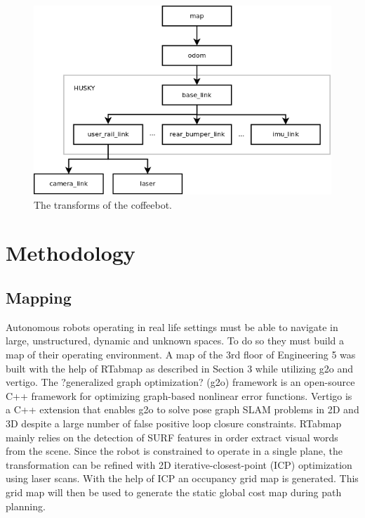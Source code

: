 \documentclass[letterpaper, 10 pt, conference]{ieeeconf}  %
\begin{document}
	\begin{figure}[!ht]
		\centering
		\includegraphics[width=1.0\columnwidth]{Figures/ROS_TF_diagram}
		\caption{The transforms of the coffeebot.}
		\label{transform_tree}
	\end{figure}

\section{Methodology}

\subsection{Mapping}

Autonomous robots operating in real life settings must be able to navigate in large, unstructured, dynamic and unknown spaces. To do so they must build a map of their operating environment. A map of the 3rd floor of Engineering 5 was built with the help of RTabmap as described in Section 3 while utilizing g2o and vertigo. The ?generalized graph optimization? (g2o) framework is an open-source C++ framework for optimizing graph-based nonlinear error functions. Vertigo is a C++ extension that enables g2o to solve pose graph SLAM problems in 2D and 3D despite a large number of false positive loop closure constraints. RTabmap mainly relies on the detection of SURF features in order extract visual words from the scene. Since the robot is constrained to operate in a single plane, the transformation can be refined with 2D iterative-closest-point (ICP) optimization using laser scans. With the help of ICP an occupancy grid map is generated. This grid map will then be used to generate the static global cost map during path planning.
\end{document}
